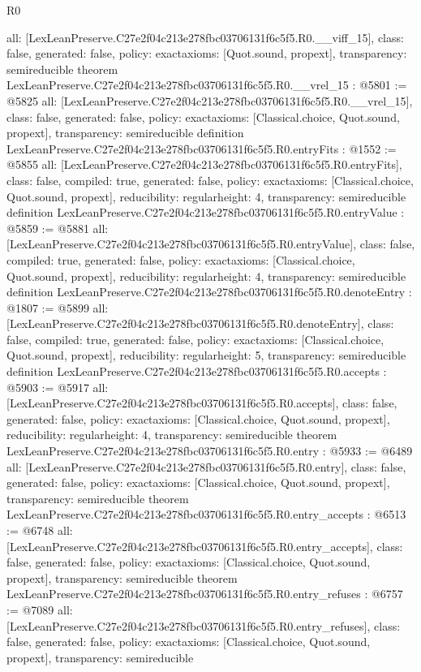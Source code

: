 \begin{lexlean}{R0}
\begin{coremodule}
{  all: [LexLeanPreserve.C27e2f04c213e278fbc03706131f6c5f5.R0.__viff_15],
  class: false,
  generated: false,
  policy: exact{axioms: [Quot.sound, propext]},
  transparency: semireducible
}
theorem LexLeanPreserve.C27e2f04c213e278fbc03706131f6c5f5.R0.__vrel_15 : @5801 := @5825 {
  all: [LexLeanPreserve.C27e2f04c213e278fbc03706131f6c5f5.R0.__vrel_15],
  class: false,
  generated: false,
  policy: exact{axioms: [Classical.choice, Quot.sound, propext]},
  transparency: semireducible
}
definition LexLeanPreserve.C27e2f04c213e278fbc03706131f6c5f5.R0.entryFits : @1552 := @5855 {
  all: [LexLeanPreserve.C27e2f04c213e278fbc03706131f6c5f5.R0.entryFits],
  class: false,
  compiled: true,
  generated: false,
  policy: exact{axioms: [Classical.choice, Quot.sound, propext]},
  reducibility: regular{height: 4},
  transparency: semireducible
}
definition LexLeanPreserve.C27e2f04c213e278fbc03706131f6c5f5.R0.entryValue : @5859 := @5881 {
  all: [LexLeanPreserve.C27e2f04c213e278fbc03706131f6c5f5.R0.entryValue],
  class: false,
  compiled: true,
  generated: false,
  policy: exact{axioms: [Classical.choice, Quot.sound, propext]},
  reducibility: regular{height: 4},
  transparency: semireducible
}
definition LexLeanPreserve.C27e2f04c213e278fbc03706131f6c5f5.R0.denoteEntry : @1807 := @5899 {
  all: [LexLeanPreserve.C27e2f04c213e278fbc03706131f6c5f5.R0.denoteEntry],
  class: false,
  compiled: true,
  generated: false,
  policy: exact{axioms: [Classical.choice, Quot.sound, propext]},
  reducibility: regular{height: 5},
  transparency: semireducible
}
definition LexLeanPreserve.C27e2f04c213e278fbc03706131f6c5f5.R0.accepts : @5903 := @5917 {
  all: [LexLeanPreserve.C27e2f04c213e278fbc03706131f6c5f5.R0.accepts],
  class: false,
  generated: false,
  policy: exact{axioms: [Classical.choice, Quot.sound, propext]},
  reducibility: regular{height: 4},
  transparency: semireducible
}
theorem LexLeanPreserve.C27e2f04c213e278fbc03706131f6c5f5.R0.entry : @5933 := @6489 {
  all: [LexLeanPreserve.C27e2f04c213e278fbc03706131f6c5f5.R0.entry],
  class: false,
  generated: false,
  policy: exact{axioms: [Classical.choice, Quot.sound, propext]},
  transparency: semireducible
}
theorem LexLeanPreserve.C27e2f04c213e278fbc03706131f6c5f5.R0.entry_accepts : @6513 := @6748 {
  all: [LexLeanPreserve.C27e2f04c213e278fbc03706131f6c5f5.R0.entry_accepts],
  class: false,
  generated: false,
  policy: exact{axioms: [Classical.choice, Quot.sound, propext]},
  transparency: semireducible
}
theorem LexLeanPreserve.C27e2f04c213e278fbc03706131f6c5f5.R0.entry_refuses : @6757 := @7089 {
  all: [LexLeanPreserve.C27e2f04c213e278fbc03706131f6c5f5.R0.entry_refuses],
  class: false,
  generated: false,
  policy: exact{axioms: [Classical.choice, Quot.sound, propext]},
  transparency: semireducible
}


\end{coremodule}
\end{lexlean}
